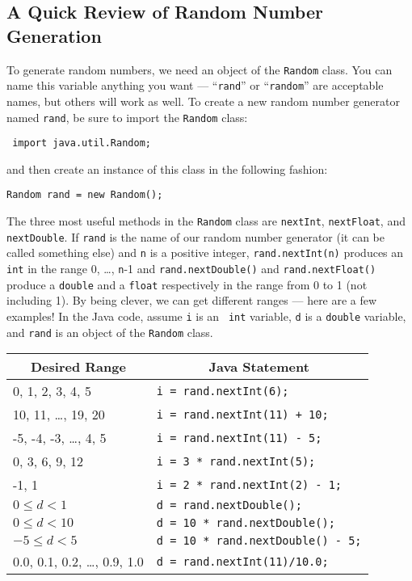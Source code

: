 \vspace{-0.125in}
\subsection*{A Quick Review of Random Number Generation}
\vspace{-0.05in}

To generate random numbers, we need an object of the {\tt Random} class.  You can name this variable anything you want
--- ``{\tt rand}'' or ``{\tt random}'' are acceptable names, but others will work as well. To create a new random number
generator named {\tt rand}, be sure to import the {\tt Random} class:

\vspace{-0.1in}
\begin{center}
\verb$ import java.util.Random;$
\end{center}
\vspace{-0.1in}

\noindent
and then create an instance of this class in the following fashion:

\vspace{-0.1in}
\begin{center}
\verb$Random rand = new Random();$
\end{center}
\vspace{-0.1in}

The three most useful methods in the {\tt Random} class are {\tt nextInt}, {\tt nextFloat}, and {\tt nextDouble}. If
{\tt rand} is the name of our random number generator (it can be called something else) and {\tt n} is a positive
integer, {\tt rand.nextInt(n)} produces an {\tt int} in the range 0, \ldots, {\tt n}-1 and {\tt rand.nextDouble()} and
{\tt rand.nextFloat()} produce a {\tt double} and a {\tt float} respectively in the range from 0 to 1 (not including 1).
By being clever, we can get different ranges --- here are a few examples! In the Java code, assume {\tt i} is an {\tt
int} variable, {\tt d} is a {\tt double} variable, and {\tt rand} is an object of the {\tt Random} class.

\begin{center}
\begin{tabular}{p{2.5in}p{3.5in}}
\multicolumn{1}{c}{\bf Desired Range} & \multicolumn{1}{c}{\bf Java
Statement}\\\hline
0, 1, 2, 3, 4, 5 & \verb$i = rand.nextInt(6);$\\
10, 11, \ldots, 19, 20 & \verb$i = rand.nextInt(11) + 10;$\\
-5, -4, -3, \ldots, 4, 5 & \verb$i = rand.nextInt(11) - 5;$\\
0, 3, 6, 9, 12 & \verb$i = 3 * rand.nextInt(5);$\\
-1, 1 & \verb$i = 2 * rand.nextInt(2) - 1;$\\
$0 \leq d < 1$ & \verb$d = rand.nextDouble();$\\
$0 \leq d < 10$ & \verb$d = 10 * rand.nextDouble();$\\
$-5 \leq d < 5$ & \verb$d = 10 * rand.nextDouble() - 5;$\\
0.0, 0.1, 0.2, \ldots, 0.9, 1.0 & \verb$d = rand.nextInt(11)/10.0;$
\end{tabular}
\end{center}

